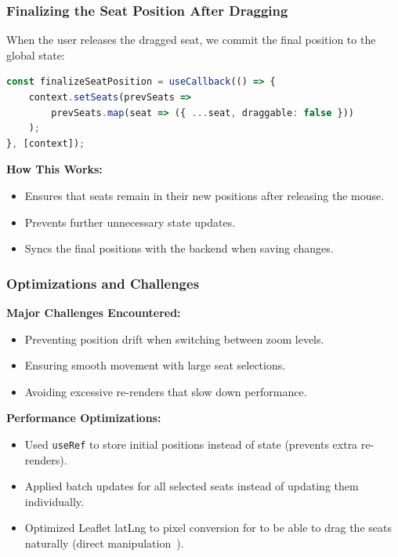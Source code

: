 \subsubsection{Finalizing the Seat Position After Dragging}
When the user releases the dragged seat, we commit the final position to the global state:

\begin{lstlisting}[language=TypeScript, caption=Finalizing Seat Position After Dragging, label=lst:seat-drop-final]
const finalizeSeatPosition = useCallback(() => {
    context.setSeats(prevSeats =>
        prevSeats.map(seat => ({ ...seat, draggable: false }))
    );
}, [context]);
\end{lstlisting}

\textbf{How This Works:}
\begin{itemize}
    \item Ensures that seats remain in their new positions after releasing the mouse.
    \item Prevents further unnecessary state updates.
    \item Syncs the final positions with the backend when saving changes.
\end{itemize}

\subsubsection{Optimizations and Challenges}
\textbf{Major Challenges Encountered:}
\begin{itemize}
    \item Preventing position drift when switching between zoom levels.
    \item Ensuring smooth movement with large seat selections.
    \item Avoiding excessive re-renders that slow down performance.
\end{itemize}

\textbf{Performance Optimizations:}
\begin{itemize}
    \item Used \texttt{useRef} to store initial positions instead of state (prevents extra re-renders).
    \item Applied batch updates for all selected seats instead of updating them individually.
    \item Optimized Leaflet latLng to pixel conversion for to be able to drag the seats naturally (direct manipulation~\cite{Hutchins01121985}).
\end{itemize}

